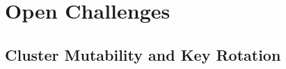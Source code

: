 \documentclass[11pt,a4paper]{article}
\newcommand{\aggsig}{\texttt{AggregatedXMSS}\xspace}
\newcommand{\XMSS}{\textsf{XMSS}\xspace}
\begin{document}
%
%

\section{Open Challenges}
\label{sec:challenges}

\subsection{Cluster Mutability and Key Rotation}
\label{subsec:mutability}
\end{document}
